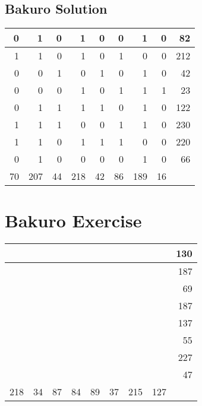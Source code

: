 \documentclass[]{article}
\begin{document}
 \subsection{Bakuro Solution} 
\begin{tabular}{rrrrrrrrr}
\hline
  0 &   1 &  0 &   1 &  0 &  0 &   1 &  0 &  82 \\ \hline
  1 &   1 &  0 &   1 &  0 &  1 &   0 &  0 & 212 \\ \hline
  0 &   0 &  1 &   0 &  1 &  0 &   1 &  0 &  42 \\ \hline
  0 &   0 &  0 &   1 &  0 &  1 &   1 &  1 &  23 \\ \hline
  0 &   1 &  1 &   1 &  1 &  0 &   1 &  0 & 122 \\ \hline
  1 &   1 &  1 &   0 &  0 &  1 &   1 &  0 & 230 \\ \hline
  1 &   1 &  0 &   1 &  1 &  1 &   0 &  0 & 220 \\ \hline
  0 &   1 &  0 &   0 &  0 &  0 &   1 &  0 &  66 \\ \hline
 70 & 207 & 44 & 218 & 42 & 86 & 189 & 16 &     \\ \hline
\hline
\end{tabular}\newpage\section{Bakuro Exercise}\begin{tabular}{rrrrrrrrr}
\hline
     &    &    &    &    &    &     &     & 130 \\ \hline
     &    &    &    &    &    &     &     & 187 \\ \hline
     &    &    &    &    &    &     &     &  69 \\ \hline
     &    &    &    &    &    &     &     & 187 \\ \hline
     &    &    &    &    &    &     &     & 137 \\ \hline
     &    &    &    &    &    &     &     &  55 \\ \hline
     &    &    &    &    &    &     &     & 227 \\ \hline
     &    &    &    &    &    &     &     &  47 \\ \hline
 218 & 34 & 87 & 84 & 89 & 37 & 215 & 127 &     \\ \hline
\hline
\end{tabular}\newpage 
\end{document}
